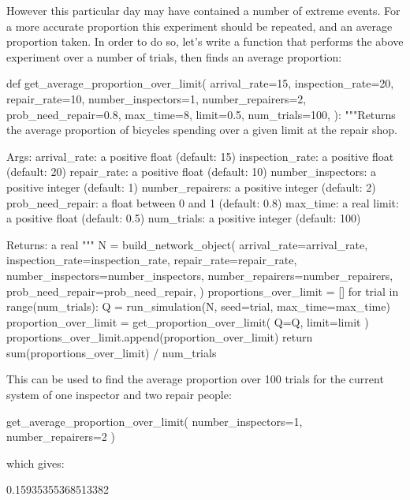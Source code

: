 However this particular day may have contained a number of extreme events.
For a more accurate proportion this experiment should be repeated, and an
average proportion taken.
In order to do so, let's write a function that performs the above experiment
over a number of trials, then finds an average proportion:

\begin{pyin}
def get_average_proportion_over_limit(
    arrival_rate=15,
    inspection_rate=20,
    repair_rate=10,
    number_inspectors=1,
    number_repairers=2,
    prob_need_repair=0.8,
    max_time=8,
    limit=0.5,
    num_trials=100,
):
    """Returns the average proportion of bicycles spending
    over a given limit at the repair shop.
    
    Args:
        arrival_rate: a positive float (default: 15)
        inspection_rate: a positive float (default: 20)
        repair_rate: a positive float (default: 10)
        number_inspectors: a positive integer (default: 1)
        number_repairers: a positive integer (default: 2)
        prob_need_repair: a float between 0 and 1 (default: 0.8)
        max_time: a real
        limit: a positive float (default: 0.5)   
        num_trials: a positive integer (default: 100)
    
    Returns:
        a real
    """
    N = build_network_object(
        arrival_rate=arrival_rate,
        inspection_rate=inspection_rate,
        repair_rate=repair_rate,
        number_inspectors=number_inspectors,
        number_repairers=number_repairers,
        prob_need_repair=prob_need_repair,
    )
    proportions_over_limit = []
    for trial in range(num_trials):
        Q = run_simulation(N, seed=trial, max_time=max_time)
        proportion_over_limit = get_proportion_over_limit(
            Q=Q, limit=limit
        )
        proportions_over_limit.append(proportion_over_limit)
    return sum(proportions_over_limit) / num_trials
\end{pyin}

This can be used to find the average proportion over 100 trials for the current
system of one inspector and two repair people:

\begin{pyin}
get_average_proportion_over_limit(
    number_inspectors=1, number_repairers=2
)
\end{pyin}

which gives:

\begin{pyout}
0.15935355368513382
\end{pyout}

